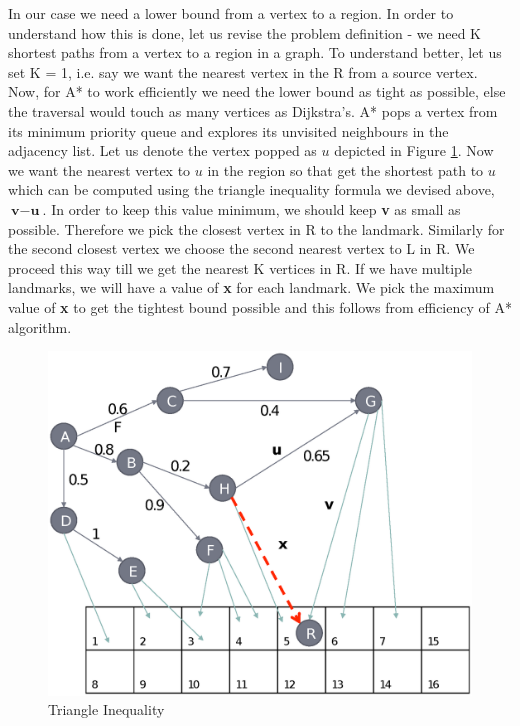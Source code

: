 {In our case we need a lower bound from a vertex to a region. In order to understand how this is done, let us revise the problem definition - we need K shortest paths from a vertex to a region in a graph. To understand better, let us set K = 1, i.e. say we want the nearest vertex in the R from a source vertex. Now, for A* to work efficiently we need the lower bound as tight as possible, else the traversal would touch as many vertices as Dijkstra's. A* pops a vertex from its minimum priority queue and explores its unvisited neighbours in the adjacency list. Let us denote the vertex popped as $u$ depicted in Figure \ref{fig:tri-ine}. Now we want the nearest vertex to $u$ in the region so that get the shortest path to $u$ which can be computed using the triangle inequality formula we devised above, $\textbf{v} - \textbf{u}$. In order to keep this value minimum, we should keep \textbf{v} as small as possible. Therefore we pick the closest vertex in R to the landmark. Similarly for the second closest vertex we choose the second nearest vertex to L in R. We proceed this way till we get the nearest K vertices in R. If we have multiple landmarks, we will have a value of \textbf{x} for each landmark. We pick the maximum value of \textbf{x} to get the tightest bound possible and this follows from efficiency of A* algorithm.

\begin{figure}[t]
    \centering
    \includegraphics[width=0.75\linewidth]{images/traingle-inequality2.eps}
    \caption{Triangle Inequality}
    \label{fig:tri-ine}
\end{figure}

}
